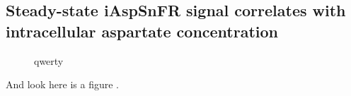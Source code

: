 \documentclass[9pt,lineno]{elife}
\begin{document}
\subsection{Steady-state iAspSnFR signal correlates with intracellular aspartate concentration}
\lipsum[7]

\begin{figure}[ht!]
\centering
{}
\caption{qwerty}
\label{fig:Fig3}
\end{figure}





And look here is a figure .
\end{document}
